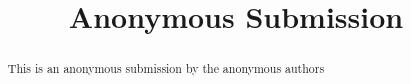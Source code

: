 \documentclass[acmsmall,screen,review,anonymous]{acmart}
\begin{document}
\title{Anonymous Submission}
\begin{abstract}
    This is an anonymous submission by the anonymous authors
\end{abstract}
\maketitle








\end{document}
